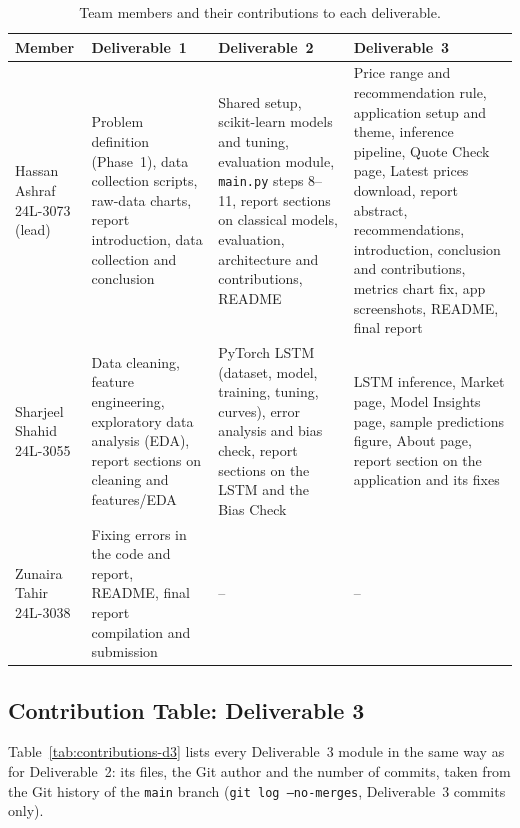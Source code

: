 \begin{table}[H]
  \centering
  \small
  \sloppy
  \begin{tabular}{p{2.4cm}p{4cm}p{4cm}p{4cm}}
    \toprule
    Member & Deliverable~1 & Deliverable~2 & Deliverable~3 \\
    \midrule
    Hassan Ashraf 24L-3073 (lead) & Problem definition (Phase~1), data collection scripts, raw-data charts, report introduction, data collection and conclusion & Shared setup, scikit-learn models and tuning, evaluation module, \texttt{main.py} steps 8--11, report sections on classical models, evaluation, architecture and contributions, README & Price range and recommendation rule, application setup and theme, inference pipeline, Quote Check page, Latest prices download, report abstract, recommendations, introduction, conclusion and contributions, metrics chart fix, app screenshots, README, final report \\
    Sharjeel Shahid 24L-3055 & Data cleaning, feature engineering, exploratory data analysis (EDA), report sections on cleaning and features/EDA & PyTorch LSTM (dataset, model, training, tuning, curves), error analysis and bias check, report sections on the LSTM and the Bias Check & LSTM inference, Market page, Model Insights page, sample predictions figure, About page, report section on the application and its fixes \\
    Zunaira Tahir 24L-3038 & Fixing errors in the code and report, README, final report compilation and submission & -- & -- \\
    \bottomrule
  \end{tabular}
  \caption{Team members and their contributions to each deliverable.}
  \label{tab:team}
\end{table}

\subsection{Contribution Table: Deliverable 3}

Table~\ref{tab:contributions-d3} lists every Deliverable~3 module in the same
way as for Deliverable~2: its files, the Git author and the number of commits,
taken from the Git history of the \texttt{main} branch (\texttt{git log
--no-merges}, Deliverable~3 commits only).


